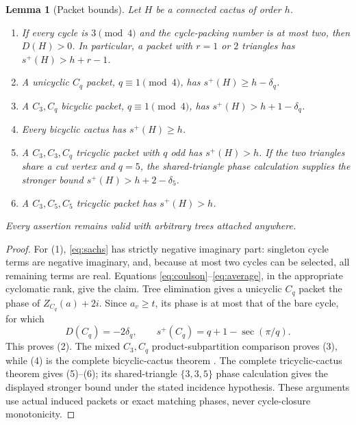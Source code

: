 \documentclass[11pt]{article}
\newtheorem{lemma}[theorem]{Lemma}
\theoremstyle{remark}
\begin{document}
\begin{lemma}[Packet bounds]\label{lem:packets}
Let $H$ be a connected cactus of order $h$.
\begin{enumerate}
\item If every cycle is $3\pmod4$ and the cycle-packing number is at most two,
then $D(H)>0$.  In particular, a packet with $r=1$ or $2$ triangles has
$s^+(H)>h+r-1$.
\item A unicyclic $C_q$ packet, $q\equiv1\pmod4$, has
$s^+(H)\geq h-\delta_q$.
\item A $C_3,C_q$ bicyclic packet, $q\equiv1\pmod4$, has
$s^+(H)>h+1-\delta_q$.
\item Every bicyclic cactus has $s^+(H)\geq h$.
\item A $C_3,C_3,C_q$ tricyclic packet with $q$ odd has $s^+(H)>h$.
If the two triangles share a cut vertex and $q=5$, the shared-triangle phase
calculation supplies the stronger bound $s^+(H)>h+2-\delta_5$.
\item A $C_3,C_5,C_5$ tricyclic packet has $s^+(H)>h$.
\end{enumerate}
Every assertion remains valid with arbitrary trees attached anywhere.
\end{lemma}

\begin{proof}
For (1), \eqref{eq:sachs} has strictly negative imaginary part: singleton
cycle terms are negative imaginary, and, because at most two cycles can be
selected, all remaining terms are real.  Equations
\eqref{eq:coulson}--\eqref{eq:average}, in the appropriate cyclomatic rank,
give the claim.  Tree elimination gives a unicyclic $C_q$ packet the phase
of $Z_{C_q}(a)+2i$.  Since $a_v\geq t$, its phase is at most that of the bare
cycle, for which
\[
 D(C_q)=-2\delta_q,
 \qquad s^+(C_q)=q+1-\sec(\pi/q).
\]
This proves (2).  The mixed $C_3,C_q$ product-subpartition comparison proves
(3), while (4) is the complete bicyclic-cactus theorem
\cite{AllBicyclic}.  The complete tricyclic-cactus theorem
\cite{AllTricyclic} gives (5)--(6); its shared-triangle $\{3,3,5\}$ phase
calculation gives the displayed stronger bound under the stated incidence
hypothesis.  These arguments use actual induced packets or exact matching
phases, never cycle-closure monotonicity.
\end{proof}
\end{document}
